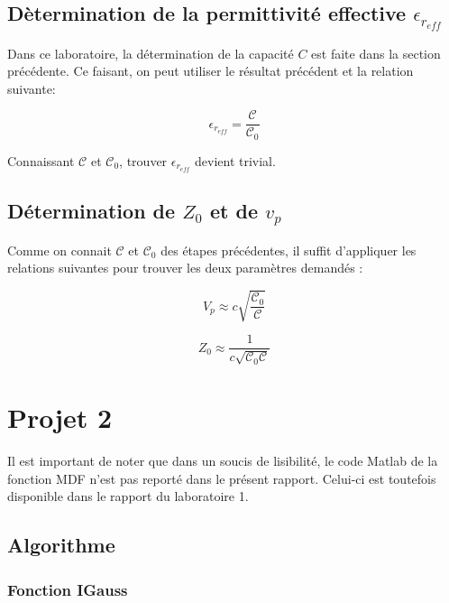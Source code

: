 \subsection{Dètermination de la permittivité effective $\epsilon_{r_{eff}}$}
Dans ce laboratoire, la détermination de la capacité $C$ est faite dans la section précédente. Ce faisant, on peut utiliser le résultat précédent et la relation suivante:

\begin{equation}
	\epsilon_{r_{eff}} = \frac{\mathcal{C}}{\mathcal{C}_0}
\end{equation}

Connaissant $\mathcal{C}$ et $\mathcal{C}_0$, trouver $\epsilon_{r_{eff}}$ devient trivial.

\subsection{Détermination de $Z_0$ et de $v_p$}
Comme on connait $\mathcal{C}$ et $\mathcal{C}_0$ des étapes précédentes, il suffit d'appliquer les relations suivantes pour trouver les deux paramètres demandés : 

\begin{equation}
	V_p \approx c\sqrt{\frac{\mathcal{C}_0}{\mathcal{C}}}
\end{equation}

\begin{equation}
	Z_0 \approx \frac{1}{c\sqrt{\mathcal{C}_0\mathcal{C}}}
\end{equation}


\newpage
\section{Projet 2}
Il est important de noter que dans un soucis de lisibilité, le code Matlab de la fonction MDF n'est pas reporté dans le présent rapport. Celui-ci est toutefois disponible dans le rapport du laboratoire 1.

\subsection{Algorithme}
\subsubsection{Fonction IGauss}

